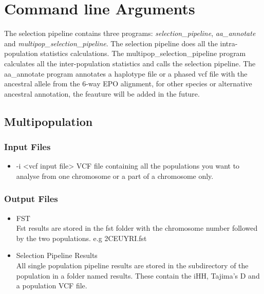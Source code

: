 \documentclass[a4paper,10pt]{article}
\begin{document}
                             \section{Command line Arguments}
                             The selection pipeline contains three programs:
                             \emph{selection\_pipeline}, \emph{aa\_annotate} and
                             \emph{multipop\_selection\_pipeline}. The selection pipeline does all the
                             intra-population statistics calculations. The multipop\_selection\_pipeline program
                             calculates all the inter-population statistics and calls the selection
                             pipeline. The aa\_annotate program annotates a haplotype file or a
                             phased vcf file with the ancestral allele from the 6-way EPO
                             alignment, for other species or alternative ancestral annotation, the
                             feauture will be added in the future.

                             \subsection{Multipopulation}
                             \subsubsection{Input Files}
                             \begin{itemize}
                             \item -i <vcf input file>
                             VCF file containing all the populations you want to analyse from one chromosome or a part of a chromosome only. 
                             \end{itemize}
                             \subsubsection{Output Files}
                             \begin{itemize}
                             \item FST \\
                             Fst results are stored in the fst folder with the chromosome number followed by the two populations. e.g 2CEUYRI.fst
                             \item Selection Pipeline Results\\
                             All single population pipeline results are stored in the subdirectory of the population in a folder named results. These contain the iHH, Tajima's D and a population VCF file.
                             \end{itemize}
\end{document}
